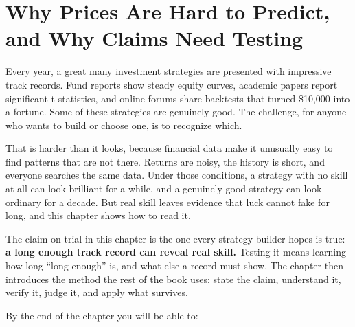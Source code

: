 \makeatletter
{}
\makeatother

\chapter{Why Prices Are Hard to Predict, and Why Claims Need Testing}
\label{ch:01}

Every year, a great many investment strategies are presented with impressive track records. Fund reports show steady equity curves, academic papers report significant t-statistics, and online forums share backtests that turned \$10,000 into a fortune. Some of these strategies are genuinely good. The challenge, for anyone who wants to build or choose one, is to recognize which.

That is harder than it looks, because financial data make it unusually easy to find patterns that are not there. Returns are noisy, the history is short, and everyone searches the same data. Under those conditions, a strategy with no skill at all can look brilliant for a while, and a genuinely good strategy can look ordinary for a decade. But real skill leaves evidence that luck cannot fake for long, and this chapter shows how to read it.

The claim on trial in this chapter is the one every strategy builder hopes is true: \textbf{a long enough track record can reveal real skill.} Testing it means learning how long ``long enough'' is, and what else a record must show. The chapter then introduces the method the rest of the book uses: state the claim, understand it, verify it, judge it, and apply what survives.

By the end of the chapter you will be able to:

